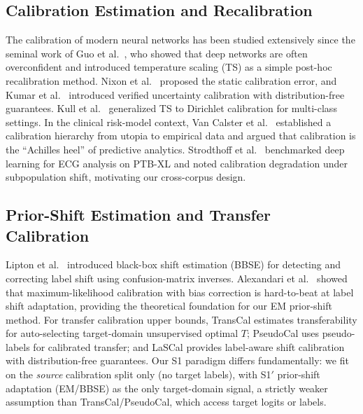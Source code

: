 \documentclass[review,12pt,nonatbib]{elsarticle}
\begin{document}
\subsection{Calibration Estimation and Recalibration}
The calibration of modern neural networks has been studied extensively
since the seminal work of Guo et al.\ \cite{guo2017calibration}, who
showed that deep networks are often overconfident and introduced
temperature scaling (TS) as a simple post-hoc recalibration method.
Nixon et al.\ \cite{nixon2019} proposed the static calibration error,
and Kumar et al.\ \cite{kumar2019} introduced verified uncertainty
calibration with distribution-free guarantees. Kull et al.\
\cite{kull2019dirichlet} generalized TS to Dirichlet calibration for
multi-class settings. In the clinical risk-model context, Van Calster
et al.\ \cite{vancalster2016,vancalster2019} established a calibration
hierarchy from utopia to empirical data and argued that calibration is
the ``Achilles heel'' of predictive analytics. Strodthoff et al.\
\cite{strodthoff2021} benchmarked deep learning for ECG analysis on
PTB-XL and noted calibration degradation under subpopulation shift,
motivating our cross-corpus design.

\subsection{Prior-Shift Estimation and Transfer Calibration}
Lipton et al.\ \cite{lipton2018bbs} introduced black-box shift
estimation (BBSE) for detecting and correcting label shift using
confusion-matrix inverses. Alexandari et al.\ \cite{alexandari2020}
showed that maximum-likelihood calibration with bias correction is
hard-to-beat at label shift adaptation, providing the theoretical
foundation for our EM prior-shift method. For transfer calibration
upper bounds, TransCal \cite{transcal2020} estimates transferability
for auto-selecting target-domain unsupervised optimal $T$; PseudoCal
\cite{pseudocal2020} uses pseudo-labels for calibrated transfer; and
LaSCal \cite{lascal2024} provides label-aware shift calibration with
distribution-free guarantees. Our S1 paradigm differs fundamentally:
we fit on the \emph{source} calibration split only (no target labels),
with S1$'$ prior-shift adaptation (EM/BBSE) as the only target-domain
signal, a strictly weaker assumption than TransCal/PseudoCal, which
access target logits or labels.
\end{document}
